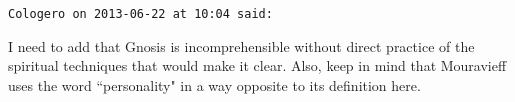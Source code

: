 \begin{footnotesize}
\begin{sffamily}
\hfill

\texttt{Cologero on 2013-06-22 at 10:04 said: }

I need to add that Gnosis is incomprehensible without direct practice of the spiritual techniques that would make it clear. Also, keep in mind that Mouravieff uses the word ``personality" in a way opposite to its definition here.


\end{sffamily}\end{footnotesize}
